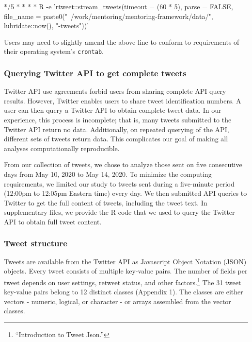 \documentclass[
]{article}
\newenvironment{Shaded}{\begin{snugshade}}{\end{snugshade}}
\newcommand{\ExtensionTok}[1]{#1}
\newcommand{\NormalTok}[1]{#1}
\newcommand{\StringTok}[1]{\textcolor[rgb]{0.31,0.60,0.02}{#1}}
\begin{document}
\begin{Shaded}
\begin{Highlighting}[]
\ExtensionTok{*/5}\NormalTok{ * * * * R -e }\StringTok{'rtweet::stream_tweets(timeout = (60 * 5), }
\StringTok{parse = FALSE, file_name = paste0("~/work/mentoring/mentoring-framework/data/",}
\StringTok{lubridate::now(), "-tweets"))'}
\end{Highlighting}
\end{Shaded}

Users may need to slightly amend the above line to conform to
requirements of their operating system's \texttt{crontab}.

\hypertarget{querying-twitter-api-to-get-complete-tweets}{%
\subsubsection{Querying Twitter API to get complete
tweets}\label{querying-twitter-api-to-get-complete-tweets}}

Twitter API use agreements forbid users from sharing complete API query
results. However, Twitter enables users to share tweet identification
numbers. A user can then query a Twitter API to obtain complete tweet
data. In our experience, this process is incomplete; that is, many
tweets submitted to the Twitter API return no data. Additionally, on
repeated querying of the API, different sets of tweets return data. This
complicates our goal of making all analyses computationally
reproducible.

From our collection of tweets, we chose to analyze those sent on five
consecutive days from May 10, 2020 to May 14, 2020. To minimize the
computing requirements, we limited our study to tweets sent during a
five-minute period (12:00pm to 12:05pm Eastern time) every day. We then
submitted API queries to Twitter to get the full content of tweets,
including the tweet text. In supplementary files, we provide the R code
that we used to query the Twitter API to obtain full tweet content.

\hypertarget{tweet-structure}{%
\subsubsection{Tweet structure}\label{tweet-structure}}

Tweets are available from the Twitter API as Javascript Object Notation
(JSON) objects. Every tweet consists of multiple key-value pairs. The
number of fields per tweet depends on user settings, retweet status, and
other factors.\footnote{``Introduction to Tweet Json.''} The 31 tweet
key-value pairs belong to 12 distinct classes (Appendix 1). The classes
are either vectors - numeric, logical, or character - or arrays
assembled from the vector classes.
\end{document}
